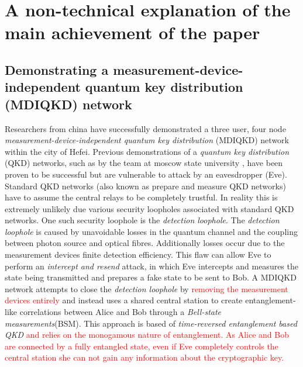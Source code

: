 \documentclass{article}
\begin{document}
\section*{A non-technical explanation of the main achievement of the paper}
\begin{mdframed}
\printnomenclature
\end{mdframed}

\subsection*{Demonstrating a measurement-device-independent quantum key distribution (MDIQKD) network}


Researchers from china have successfully demonstrated a three user, four node \textit{measurement-device-independent quantum key distribution} (MDIQKD) network within the city of Hefei. Previous demonstrations of a \textit{quantum key distribution} (QKD) networks, such as by the team at moscow state university\cite{2017QuEle..47..798K} , have been proven to be successful but are vulnerable to attack by an eavesdropper (Eve). Standard QKD networks (also known as prepare and measure QKD networks) have to assume the central relays to be completely trustful. In reality this is extremely unlikely due various security loopholes associated with standard QKD networks. One such security loophole is the \textit{detection loophole}. The \textit{detection loophole} is caused by unavoidable losses in the quantum channel and  the coupling between photon source and optical fibres. Additionally losses occur due to the measurement devices finite detection efficiency. This flaw can allow Eve to perform an \textit{intercept and resend} attack, in which Eve intercepts and measures the state being transmitted and prepares a fake state to be sent to Bob. A MDIQKD network attempts to close the \textit{detection loophole} by \textcolor{red}{removing the measurement devices entirely} and instead uses a shared  central station to create entanglement-like correlations between Alice and Bob through a \textit{Bell-state measurements}(BSM). This approach is based of \textit{time-reversed entanglement based QKD}\cite{PhysRevA.54.2651} \textcolor{red}{and relies on the monogamous nature of entanglement. As Alice and Bob are connected by a fully entangled state, even if Eve completely controls the central station she can not gain any information about the cryptographic key.}
\end{document}
